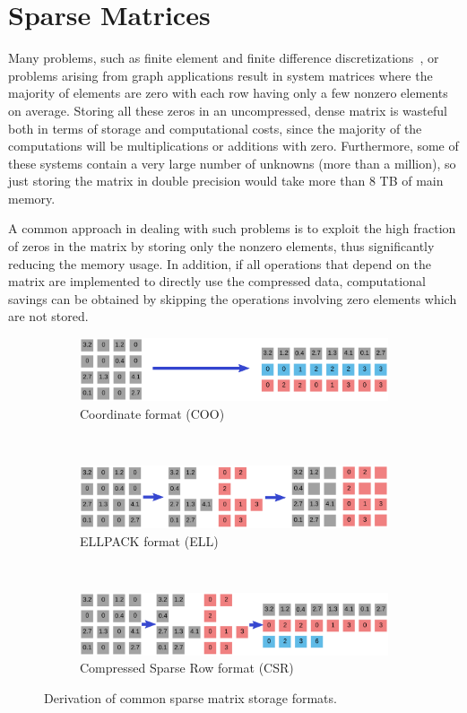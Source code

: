 \section{Sparse Matrices}
\label{introduction:sec:sparse}

Many problems, such as finite element and finite difference
discretizations~\cite{saad,duff}, or problems arising from graph applications
result in system matrices where the majority of elements are zero with
each row having only a few nonzero elements on average. Storing all these zeros
in an uncompressed, dense matrix is wasteful both in terms of storage and
computational costs, since the majority of the computations will be
multiplications or additions with zero. Furthermore, some of these systems
contain a very large number of unknowns (more than a million), so just storing
the matrix in double precision would take more than 8 TB of main memory.

A common approach in dealing with such problems is to exploit the high fraction
of zeros in the matrix by storing only the nonzero elements, thus significantly
reducing the memory usage. In addition, if all operations that depend on the
matrix are implemented to directly use the compressed data, computational
savings can be obtained by skipping the operations involving zero elements
which are not stored.

\begin{figure}
\begin{subfigure}{\columnwidth}
\includegraphics[width=\columnwidth]{plots/coo}
\caption{Coordinate format (COO)}
\end{subfigure} \\[2em]
\begin{subfigure}{\columnwidth}
\includegraphics[width=\columnwidth]{plots/ell}
\caption{ELLPACK format (ELL)}
\end{subfigure} \\[2em]
\begin{subfigure}{\columnwidth}
\includegraphics[width=\columnwidth]{plots/csr}
\caption{Compressed Sparse Row format (CSR)}
\end{subfigure}
\caption{Derivation of common sparse matrix storage formats.}
\label{introduction:fig:sparse-formats}
\end{figure}

